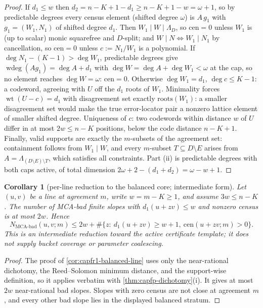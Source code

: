 \documentclass[11pt]{article}
\newtheorem{corollary}[corollary]{Corollary}
\theoremstyle{definition}
\theoremstyle{remark}
\begin{document}
\begin{proof}
If $d_1\le w$ then $d_2=n-K+1-d_1\ge n-K+1-w=\omega+1$, so by predictable degrees every census element \textup(shifted degree $\omega$\textup) is $A\,g_1$ with $g_1=(W_1,N_1)$ of shifted degree $d_1$.  Then $W_1\mid W\mid\Lambda_D$, so $\mathrm{cen}=0$ unless $W_1$ is \textup(up to scalar\textup) monic squarefree and $D$-split; and $W\mid N\iff W_1\mid N_1$ by cancellation, so $\mathrm{cen}=0$ unless $c:=N_1/W_1$ is a polynomial.  If $\deg N_1-(K-1)>\deg W_1$, predictable degrees give $\operatorname{wdeg}(Ag_1)=\deg A+d_1$ with $\deg W=\deg A+\deg W_1<\omega$ at the cap, so no element reaches $\deg W=\omega$: $\mathrm{cen}=0$.  Otherwise $\deg W_1=d_1$, $\deg c\le K-1$: a codeword, agreeing with $U$ off the $d_1$ roots of $W_1$.  Minimality forces $\operatorname{wt}(U-c)=d_1$ with disagreement set exactly $\mathrm{roots}(W_1)$: a smaller disagreement set would make the true error-locator pair a nonzero lattice element of smaller shifted degree.  Uniqueness of $c$: two codewords within distance $w$ of $U$ differ in at most $2w\le n-K$ positions, below the code distance $n-K+1$.  Finally, valid supports are exactly the $m$-subsets of the agreement set: containment follows from $W_1\mid W$, and every $m$-subset $T\subseteq D\setminus E$ arises from $A=\Lambda_{(D\setminus E)\setminus T}$, which satisfies all constraints.  Part \textup{(ii)} is predictable degrees with both caps active, of total dimension $2\omega+2-(d_1+d_2)=\omega-w+1$.
\end{proof}

\begin{corollary}[per-line reduction to the balanced core; intermediate form]\label{cor:capfp-line}
Let $(u,v)$ be a line at agreement $m$, write $w=m-K\ge1$, and assume
$3w\le n-K$.  The number of MCA-bad finite slopes with
$d_1(u+zv)\le w$ and nonzero census is at most $2w$.  Hence
\[
        N_{\mathrm{MCA\text{-}bad}}(u,v;m)
        \le 2w+\#\{z:\ d_1(u+zv)\ge w+1,\ \mathrm{cen}(u+zv;m)>0\}.
\]
This is an intermediate reduction toward the active certificate template; it does not supply bucket coverage or parameter coalescing.
\end{corollary}

\begin{proof}
The proof of \cref{cor:capfr1-balanced-line} uses only the near-rational
dichotomy, the Reed--Solomon minimum distance, and the support-wise definition,
so it applies verbatim with \cref{thm:capfp-dichotomy}(i).  It gives at most
$2w$ near-rational bad slopes.  Slopes with zero census are not close at
agreement $m$, and every other bad slope lies in the displayed balanced
stratum.
\end{proof}
\end{document}
